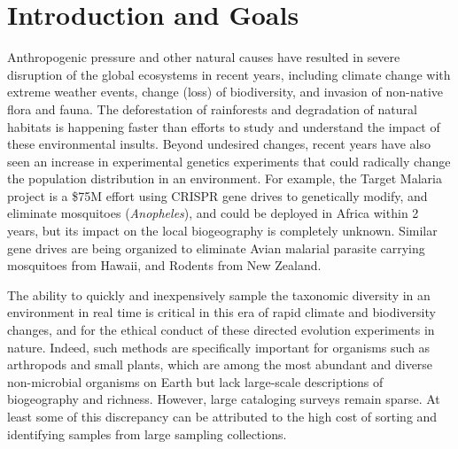 \section{Introduction and Goals}
Anthropogenic pressure and other natural causes have resulted in
severe disruption of the global ecosystems in recent years, including
climate change with extreme weather events, change (loss) of
biodiversity, and invasion of non-native flora and fauna. The
deforestation of rainforests and degradation of natural habitats is
happening faster than efforts to study and understand the impact of
these environmental insults.  Beyond undesired changes, recent years
have also seen an increase in experimental genetics experiments that
could radically change the population distribution in an
environment. For example, the Target Malaria project is a \$75M effort
using CRISPR gene drives to genetically modify, and eliminate
mosquitoes (\emph{Anopheles}), and could be deployed in Africa within
2 years\cite{TargetMalaria}, but its impact on the local biogeography
is completely unknown.  Similar gene drives are being organized to
eliminate Avian malarial parasite carrying mosquitoes from
Hawaii\cite{Liao2017}, and Rodents from New Zealand\cite{Owens2017}.

The ability to quickly and inexpensively sample the taxonomic
diversity in an environment in real time is critical in this era of
rapid climate and biodiversity changes, and for the ethical conduct of
these directed evolution experiments in nature\cite{Oye2014}. Indeed,
such methods are specifically important for organisms such as
arthropods\cite{Beng2016} and small plants, which are among the most
abundant and diverse non-microbial organisms on Earth but lack
large-scale descriptions of biogeography and richness. However, large
cataloging surveys remain sparse. At least some of this discrepancy
can be attributed to the high cost of sorting and identifying samples
from large sampling collections.

